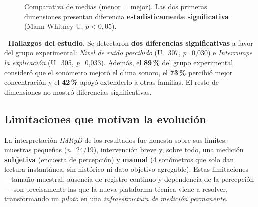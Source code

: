 \documentclass[11pt,a4paper]{article}
\begin{document}
\begin{figure}[H]
\centering
{}
\caption{\footnotesize Comparativa de medias (menor = mejor). Las dos primeras dimensiones presentan diferencia \textbf{estad\'isticamente significativa} (Mann-Whitney U, $p<0{,}05$).}
\label{fig:comparativa}
\end{figure}

\begin{KeyFinding}
\textbf{\faChartBar\ Hallazgos del estudio.} Se detectaron \textbf{dos diferencias significativas} a favor del grupo experimental: \emph{Nivel de ruido percibido} (U=307, \emph{p}=0,030) e \emph{Interrumpe la explicaci\'on} (U=305, \emph{p}=0,033). Adem\'as, el \textbf{89\,\%} del grupo experimental consider\'o que el son\'ometro mejor\'o el clima sonoro, el \textbf{73\,\%} percibi\'o mejor concentraci\'on y el \textbf{42\,\%} apoy\'o extenderlo a otras familias. El resto de dimensiones no mostr\'o diferencias significativas.
\end{KeyFinding}

\subsection{Limitaciones que motivan la evoluci\'on}
La interpretaci\'on \emph{IMRyD} de los resultados fue honesta sobre sus l\'imites: muestras peque\~nas (\emph{n}=24/19), intervenci\'on breve y, sobre todo, una medici\'on \textbf{subjetiva} (encuesta de percepci\'on) y \textbf{manual} (4 son\'ometros que solo dan lectura instant\'anea, sin hist\'orico ni dato objetivo agregable). Estas limitaciones ---tama\~no muestral, ausencia de registro continuo y dependencia de la percepci\'on--- son precisamente las que la nueva plataforma t\'ecnica viene a resolver, transformando un \emph{piloto} en una \emph{infraestructura de medici\'on permanente}.
\end{document}
